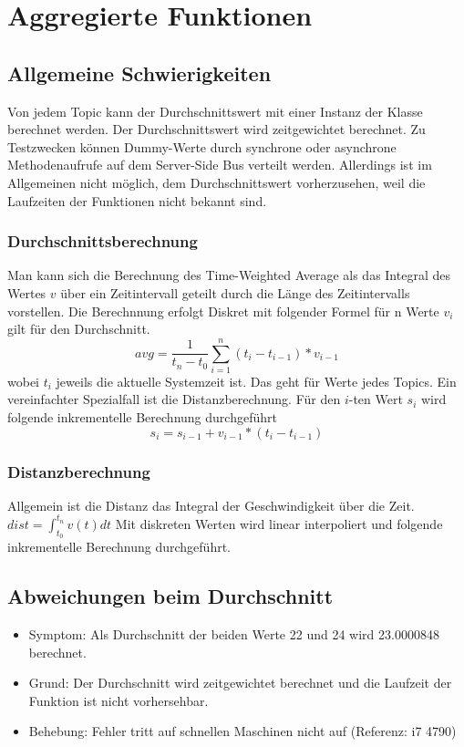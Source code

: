 \documentclass[qualitaetssicherung.tex]{subfiles}
\begin{document}
\section{Aggregierte Funktionen}

	\subsection*{Allgemeine Schwierigkeiten} 
		Von jedem Topic kann der Durchschnittswert mit einer Instanz der Klasse  berechnet werden. Der Durchschnittswert wird zeitgewichtet berechnet. Zu Testzwecken können Dummy-Werte durch synchrone oder asynchrone Methodenaufrufe auf dem Server-Side Bus verteilt werden. Allerdings ist im Allgemeinen nicht möglich, dem Durchschnittswert vorherzusehen, weil die Laufzeiten der Funktionen nicht bekannt sind.

		\subsubsection{Durchschnittsberechnung} 
		Man kann sich die Berechnung des Time-Weighted Average als das Integral des Wertes $v$ über ein Zeitintervall geteilt durch die Länge des Zeitintervalls vorstellen. Die Berechnnung erfolgt Diskret mit folgender Formel für n Werte $v_i$ gilt für den Durchschnitt.
		$$avg = \frac{1}{t_n - t_0} \sum_{i = 1}^{n} (t_i - t_{i-1}) * v_{i-1}$$ wobei $t_i$ jeweils die aktuelle Systemzeit ist. Das geht für Werte jedes Topics. Ein vereinfachter Spezialfall ist die Distanzberechnung. Für den $i$-ten Wert $s_i$ wird folgende inkrementelle Berechnung durchgeführt $$s_{i} = s_{i-1} + v_{i-1} * (t_i - t_{i-1})$$

		\subsubsection{Distanzberechnung} 

		Allgemein ist die Distanz das Integral der Geschwindigkeit über die Zeit. $dist = \int_{t_0}^{t_n} v(t) dt$ Mit diskreten Werten wird linear interpoliert und folgende inkrementelle Berechnung durchgeführt.



	\subsection{Abweichungen beim Durchschnitt} \label{DAVG}
		\begin{itemize}
			\item
			Symptom: Als Durchschnitt der beiden Werte 22 und 24 wird 23.0000848 berechnet.
			\item
			Grund: Der Durchschnitt wird zeitgewichtet berechnet und die Laufzeit der Funktion ist nicht vorhersehbar.
			\item
			Behebung: Fehler tritt auf schnellen Maschinen nicht auf (Referenz: i7 4790)

		\end{itemize}
\end{document}
